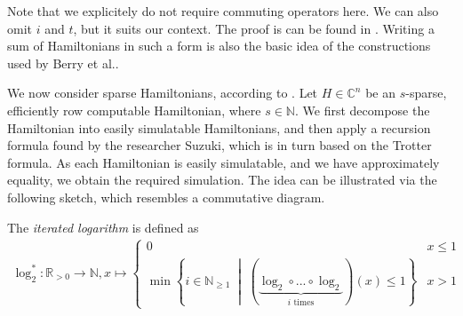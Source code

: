 Note that we explicitely do not require commuting operators here. We can also omit \(i\) and \(t\), but it suits our context. The proof is can be found in \cite[p. 207]{Nielsen2010}. Writing a sum of Hamiltonians in such a form is also the basic idea of the constructions used by Berry et al..

\phantom{}

We now consider sparse Hamiltonians, according to . Let \(H \in \mathbb{C}^n\) be an \(s\)-sparse, efficiently row computable Hamiltonian, where \(s \in \mathbb{N}\). We first decompose the Hamiltonian into easily simulatable Hamiltonians, and then apply a recursion formula found by the researcher Suzuki, which is in turn based on the Trotter formula. As each Hamiltonian is easily simulatable, and we have approximately equality, we obtain the required simulation. The idea can be illustrated via the following sketch, which resembles a commutative diagram.

\begin{minipage}{\linewidth}
    \centering
\end{minipage}

\begin{definition}
    The \emph{iterated logarithm} is defined as
    \begin{align}
        \log_2^*\colon \mathbb{R}_{> 0} \to \mathbb{N}, x \mapsto \begin{cases}
            0 & x \leq 1\\
            \min\left\{ i \in \mathbb{N}_{\geq 1} \; \middle| \; (\underbrace{\log_2 \circ ... \circ \log_2}_{i \text{ times}})(x) \leq 1 \right\} & x > 1
        \end{cases}
    \end{align}
\end{definition}


